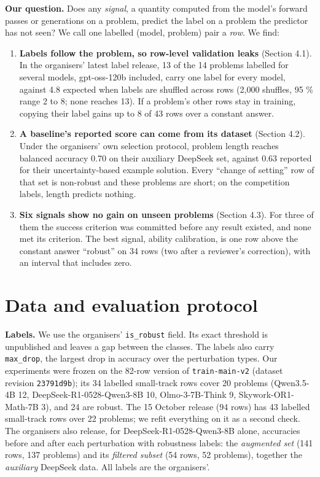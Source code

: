 \documentclass{article}
\providecommand{\tightlist}{\setlength{\itemsep}{0pt}\setlength{\parskip}{0pt}}
\begin{document}
\textbf{Our question.} Does any \emph{signal}, a quantity computed from the model's forward passes or generations on a problem, predict the label on a problem the predictor has not seen? We call one labelled (model, problem) pair a \emph{row}. We find:

\begin{enumerate}
\def\labelenumi{\arabic{enumi}.}
\tightlist
\item
  \textbf{Labels follow the problem, so row-level validation leaks} (Section 4.1). In the organisers' latest label release, 13 of the 14 problems labelled for several models, gpt-oss-120b included, carry one label for every model, against 4.8 expected when labels are shuffled across rows (2,000 shuffles, 95 \% range 2 to 8; none reaches 13). If a problem's other rows stay in training, copying their label gains up to 8 of 43 rows over a constant answer.
\item
  \textbf{A baseline's reported score can come from its dataset} (Section 4.2). Under the organisers' own selection protocol, problem length reaches balanced accuracy 0.70 on their auxiliary DeepSeek set, against 0.63 reported for their uncertainty-based example solution. Every ``change of setting'' row of that set is non-robust and these problems are short; on the competition labels, length predicts nothing.
\item
  \textbf{Six signals show no gain on unseen problems} (Section 4.3). For three of them the success criterion was committed before any result existed, and none met its criterion. The best signal, ability calibration, is one row above the constant answer ``robust'' on 34 rows (two after a reviewer's correction), with an interval that includes zero.
\end{enumerate}

\section{Data and evaluation protocol}

\textbf{Labels.} We use the organisers' \texttt{is\_robust} field. Its exact threshold is unpublished and leaves a gap between the classes. The labels also carry \texttt{max\_drop}, the largest drop in accuracy over the perturbation types. Our experiments were frozen on the 82-row version of \texttt{train-main-v2} (dataset revision \texttt{23791d9b}); its 34 labelled small-track rows cover 20 problems (Qwen3.5-4B 12, DeepSeek-R1-0528-Qwen3-8B 10, Olmo-3-7B-Think 9, Skywork-OR1-Math-7B 3), and 24 are robust. The 15 October release (94 rows) has 43 labelled small-track rows over 22 problems; we refit everything on it as a second check. The organisers also release, for DeepSeek-R1-0528-Qwen3-8B alone, accuracies before and after each perturbation with robustness labels: the \emph{augmented set} (141 rows, 137 problems) and its \emph{filtered subset} (54 rows, 52 problems), together the \emph{auxiliary} DeepSeek data. All labels are the organisers'.
\end{document}
